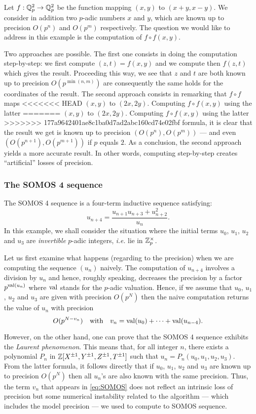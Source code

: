 \documentclass{amsart}
\begin{document}
Let $f : \mathbb Q_p^2 \to \mathbb Q_p^2$ be the function mapping $(x,y)$ to $(x+y, 
x-y)$. We consider in addition two $p$-adic numbers $x$ and $y$, 
which are known up to precision $O(p^n)$ and $O(p^m)$ respectively.
The question we would like to address in this example is the
computation of $f \circ f(x,y)$.

Two approaches are possible. The first one consists in doing the 
computation step-by-step: we first compute $(z,t) = f(x,y)$ and we 
compute then $f(z,t)$ which gives the result. Proceeding this way, we 
see that $z$ and $t$ are both known up to precision $O(p^{\min(n,m)})$ 
are consequently the same holds for the coordinates of the result.
The second approach consists in remarking that $f \circ f$ maps
<<<<<<< HEAD
$(x,y)$ to $(2x, 2y)$.  Computing $f \circ f(x,y)$ using the latter
=======
$(x,y)$ to $(2x, 2y)$. Computing $f \circ f(x,y)$ using the latter
>>>>>>> 177a9642401ae8c1ba0d7ad2abc160cd74e02fbf
formula, it is clear that the result we get is known up to precision
$(O(p^n), O(p^m))$ --- and even $(O(p^{n+1}), O(p^{m+1}))$ if $p$
equals $2$.
As a conclusion, the second approach yields a more accurate result.
In other words, computing step-by-step creates ``artificial'' losses 
of precision.

\subsubsection*{The SOMOS 4 sequence}

The SOMOS 4 sequence is a four-term inductive sequence satisfying:
$$u_{n+4} = \frac{u_{n+1} u_{n+3} + u_{n+2}^2}{u_n}.$$
In this example, we shall consider the situation where the initial
terms $u_0$, $u_1$, $u_2$ and $u_3$ are \emph{invertible} $p$-adic 
integers, \emph{i.e.} lie in $\mathbb Z_p^\times$.

Let us first examine what happens (regarding to the precision) when
we are computing the sequence $(u_n)$ naively. The computation of
$u_{n+4}$ involves a division by $u_n$ and hence, roughly speaking,
decreases the precision by a factor $p^{\text{\rm val}(u_n)}$ where $\text{\rm val}$
stands for the $p$-adic valuation. Hence, if we assume that $u_0$,
$u_1$, $u_2$ and $u_3$ are given with precision $O(p^N)$ then the
naive computation returns the value of $u_n$ with precision
\begin{equation}
\label{eq:SOMOS}
O(p^{N-v_n})
\quad \text{with}\quad
v_n = \text{\rm val}(u_0) + \cdots + \text{\rm val}(u_{n-4}).
\end{equation}

However, on the other hand, one can prove that the SOMOS 4 sequence 
exhibits the \emph{Laurent phenomenon}. This means that, for all integer 
$n$, there exists a polynomial $P_n$ in $\mathbb Z[X^{\pm 1}, Y^{\pm 1}, Z^{\pm 
1}, T^{\pm 1}]$ such that $u_n = P_n(u_0, u_1, u_2, u_3)$.
From the latter formula, it follows directly that if $u_0$, $u_1$,
$u_2$ and $u_3$ are known up to precision $O(p^N)$ then all $u_n$'s
are also known with the same precision. Thus, the term $v_n$ that 
appears in \eqref{eq:SOMOS} does not reflect an intrinsic loss of
precision but some numerical instability related to the algorithm ---
which includes the model precision --- we used to compute to SOMOS 
sequence.
\end{document}
